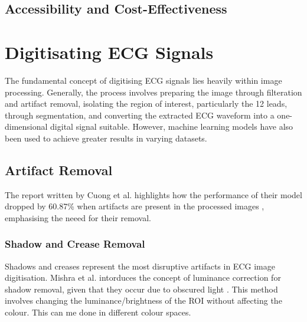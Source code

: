 \subsection{Accessibility and Cost-Effectiveness}


\section{Digitisating ECG Signals}

The fundamental concept of digitising ECG signals lies heavily within image processing. Generally, the process involves preparing the image through filteration and artifact removal, isolating the region of interest, particularly the 12 leads, through segmentation, and converting the extracted ECG waveform into a one-dimensional digital signal suitable. However, machine learning models have also been used to achieve greater results in varying datasets. 

\subsection{Artifact Removal}
The report written by Cuong et al. highlights how the performance of their model dropped by 60.87\% when artifacts are present in the processed images \cite{Cuong2024}, emphasising the neeed for their removal.

\subsubsection{Shadow and Crease Removal}
Shadows and creases represent the most disruptive artifacts in ECG image digitisation. Mishra et al. intorduces the concept of luminance correction for shadow removal, given that they occur due to obscured light \cite{Mishra2021}. This method involves changing the luminance/brightness of the \gls{ROI} without affecting the colour. This can me done in different colour spaces.

